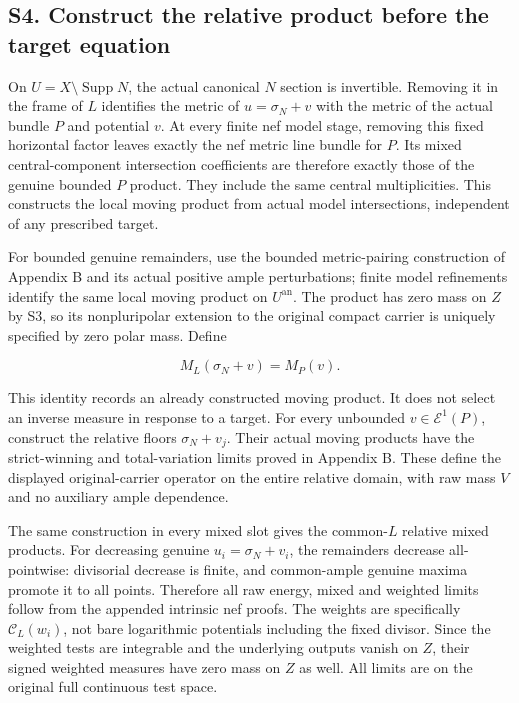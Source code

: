 \documentclass[
  10pt,
]{article}
\begin{document}
\subsection{S4. Construct the relative product before the target
equation}\label{s4.-construct-the-relative-product-before-the-target-equation}

On \(U=X\setminus\operatorname{Supp}N\), the actual canonical \(N\)
section is invertible. Removing it in the frame of \(L\) identifies the
metric of \(u=\sigma_N+v\) with the metric of the actual bundle \(P\)
and potential \(v\). At every finite nef model stage, removing this
fixed horizontal factor leaves exactly the nef metric line bundle for
\(P\). Its mixed central-component intersection coefficients are
therefore exactly those of the genuine bounded \(P\) product. They
include the same central multiplicities. This constructs the local
moving product from actual model intersections, independent of any
prescribed target.

For bounded genuine remainders, use the bounded metric-pairing
construction of Appendix B and its actual positive ample perturbations;
finite model refinements identify the same local moving product on
\(U^{\mathrm{an}}\). The product has zero mass on \(Z\) by S3, so its
nonpluripolar extension to the original compact carrier is uniquely
specified by zero polar mass. Define

\[M_L(\sigma_N+v)=M_P(v).\]

This identity records an already constructed moving product. It does not
select an inverse measure in response to a target. For every unbounded
\(v\in\mathcal E^1(P)\), construct the relative floors \(\sigma_N+v_j\).
Their actual moving products have the strict-winning and total-variation
limits proved in Appendix B. These define the displayed original-carrier
operator on the entire relative domain, with raw mass \(V\) and no
auxiliary ample dependence.

The same construction in every mixed slot gives the common-\(L\)
relative mixed products. For decreasing genuine \(u_i=\sigma_N+v_i\),
the remainders decrease all-pointwise: divisorial decrease is finite,
and common-ample genuine maxima promote it to all points. Therefore all
raw energy, mixed and weighted limits follow from the appended intrinsic
nef proofs. The weights are specifically \(\mathcal C_L(w_i)\), not bare
logarithmic potentials including the fixed divisor. Since the weighted
tests are integrable and the underlying outputs vanish on \(Z\), their
signed weighted measures have zero mass on \(Z\) as well. All limits are
on the original full continuous test space.
\end{document}
